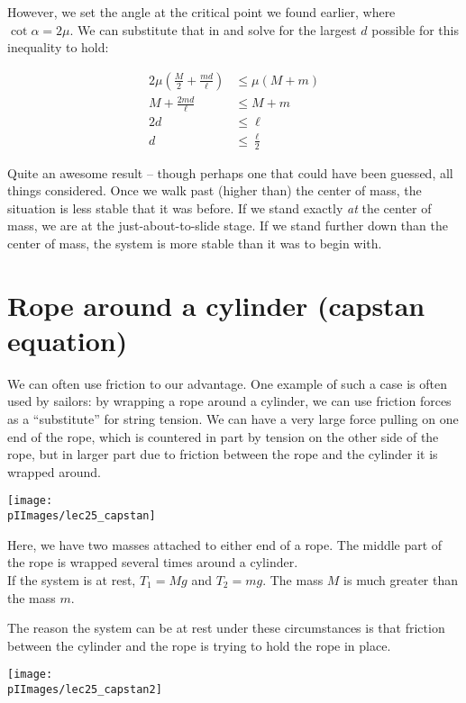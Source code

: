 However, we set the angle at the critical point we found earlier, where $\cot \alpha = 2 \mu$. We can substitute that in and solve for the largest $d$ possible for this inequality to hold:

\begin{align}
2 \mu \left(\frac{M}{2} + \frac{m d}{\ell}\right) &\le \mu (M + m)\\
M + \frac{2 m d}{\ell} &\le M + m\\
2 d &\le \ell\\
d &\le \frac{\ell}{2}
\end{align}

Quite an awesome result -- though perhaps one that could have been guessed, all things considered. Once we walk past (higher than) the center of mass, the situation is less stable that it was before. If we stand exactly \emph{at} the center of mass, we are at the just-about-to-slide stage. If we stand further down than the center of mass, the system is more stable than it was to begin with.

\section{Rope around a cylinder (capstan equation)}

We can often use friction to our advantage. One example of such a case is often used by sailors: by wrapping a rope around a cylinder, we can use friction forces as a ``substitute'' for string tension. We can have a very large force pulling on one end of the rope, which is countered in part by tension on the other side of the rope, but in larger part due to friction between the rope and the cylinder it is wrapped around.

\begin{center}
\texttt{[image: \\pIImages/lec25\_capstan]}
\end{center}

Here, we have two masses attached to either end of a rope. The middle part of the rope is wrapped several times around a cylinder.\\
If the system is at rest, $T_1 = M g$ and $T_2 = m g$. The mass $M$ is much greater than the mass $m$.

The reason the system can be at rest under these circumstances is that friction between the cylinder and the rope is trying to hold the rope in place. 

\begin{center}
\texttt{[image: \\pIImages/lec25\_capstan2]}
\end{center}


